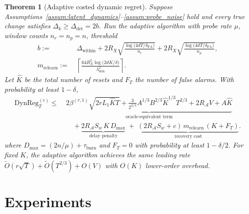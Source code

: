 \documentclass{article}
\newcommand{\cA}{\mathcal{A}}
\newcommand{\DynReg}{\mathrm{DynReg}}
\newtheorem{theorem}{Theorem}
\begin{document}
  \begin{theorem}[Adaptive costed dynamic regret]
  \label{thm:adaptive_regret}
  Suppose Assumptions~\ref{assum:latent_dynamics}--\ref{assum:probe_noise} hold and every true change satisfies $\Delta_k \ge
  \Delta_{\mathrm{det}} = 2b$.
  Run the adaptive algorithm with probe rate $\mu$, window counts $n_r = n_p = n$, threshold
\begin{equation}
\begin{aligned}
b :=\;& \Delta_{\mathrm{within}}
+ 2R_X\sqrt{\frac{\log\!\bigl(4dT/\delta_{\mathrm{FA}}\bigr)}{n_r}}
+ 2R_X\sqrt{\frac{\log\!\bigl(4dT/\delta_{\mathrm{FA}}\bigr)}{n_p}}, \\
m_{\mathrm{relearn}}
:=\;& \left\lceil
\frac{64 R_X^2 \log\!\bigl(2dK/\delta\bigr)}{\lambda_{\min}^2}
\right\rceil .
\end{aligned}
\label{eq:detector_threshold_main}
\end{equation}
  Let \(\hat K\) be the total number of resets and \(F_T\) the number of false alarms.
  With probability at least \(1-\delta\),
  \begin{equation}
  \begin{aligned}
  \DynReg_T^{(c)} \le\;&
  \underbrace{
  2\beta^{(r,1)}\sqrt{2rL_1 \hat K T}
  + \frac{3}{2^{2/3}}A^{1/3}B^{2/3}\hat K^{1/3}T^{2/3}
  + 2R_{\cA} V + A\hat K
  }_{\text{oracle-equivalent term}}
  \\[0.5em]
  &\quad
  + \underbrace{
  2R_{\cA}S_w \, K \, D_{\max}
  }_{\text{delay penalty}}
  \;+\;
  \underbrace{
  (2R_{\cA}S_w + c)\, m_{\mathrm{relearn}}\, (K + F_T)
  }_{\text{recovery cost}} .
  \end{aligned}
  \label{eq:adaptive_regret_bound}
  \end{equation}
  where $D_{\max} = (2n/\mu) + \tau_{\mathrm{burn}}$ and $F_T = 0$ with probability at least $1 - \delta/2$.
  For fixed $K$, the adaptive algorithm achieves the same leading rate $\widetilde O(r\sqrt{T}) + \widetilde O(T^{2/3}) + O(V)$ with
  $O(K)$ lower-order overhead.
  \end{theorem}




 \section{Experiments}
  \label{sec:experiments}
\end{document}
